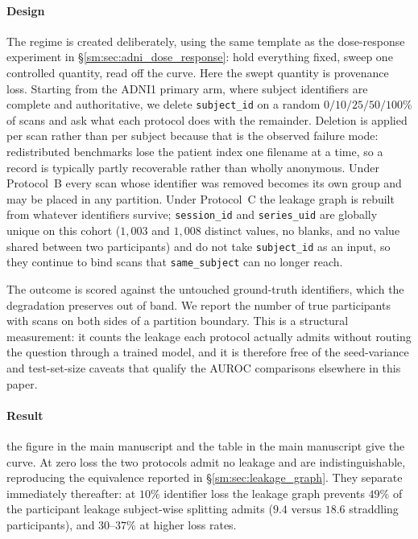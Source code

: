 \documentclass[11pt]{article}
\begin{document}
\paragraph{Design}
The regime is created deliberately, using the same template as the
dose-response experiment in \S\ref{sm:sec:adni_dose_response}: hold
everything fixed, sweep one controlled quantity, read off the curve. Here
the swept quantity is provenance loss. Starting from the ADNI1 primary
arm, where subject identifiers are complete and authoritative, we delete
\texttt{subject\_id} on a random $0/10/25/50/100\%$ of scans and ask what
each protocol does with the remainder. Deletion is applied per scan
rather than per subject because that is the observed failure mode:
redistributed benchmarks lose the patient index one filename at a time,
so a record is typically partly recoverable rather than wholly anonymous.
Under Protocol~B every scan whose identifier was removed becomes its own
group and may be placed in any partition. Under Protocol~C the leakage
graph is rebuilt from whatever identifiers survive; \texttt{session\_id}
and \texttt{series\_uid} are globally unique on this cohort ($1{,}003$
and $1{,}008$ distinct values, no blanks, and no value shared between two
participants) and do not take \texttt{subject\_id} as an input, so they
continue to bind scans that \texttt{same\_subject} can no longer reach.

The outcome is scored against the untouched ground-truth identifiers,
which the degradation preserves out of band. We report the number of true
participants with scans on both sides of a partition boundary. This is a
structural measurement: it counts the leakage each protocol actually
admits without routing the question through a trained model, and it is
therefore free of the seed-variance and test-set-size caveats that
qualify the AUROC comparisons elsewhere in this paper.





\paragraph{Result}
the figure in the main manuscript and
the table in the main manuscript give the curve. At zero loss
the two protocols admit no leakage and are indistinguishable,
reproducing the equivalence reported in \S\ref{sm:sec:leakage_graph}.
They separate immediately thereafter: at $10\%$ identifier loss the
leakage graph prevents $49\%$ of the participant leakage subject-wise
splitting admits ($9.4$ versus $18.6$ straddling participants), and
$30$--$37\%$ at higher loss rates.
\end{document}
